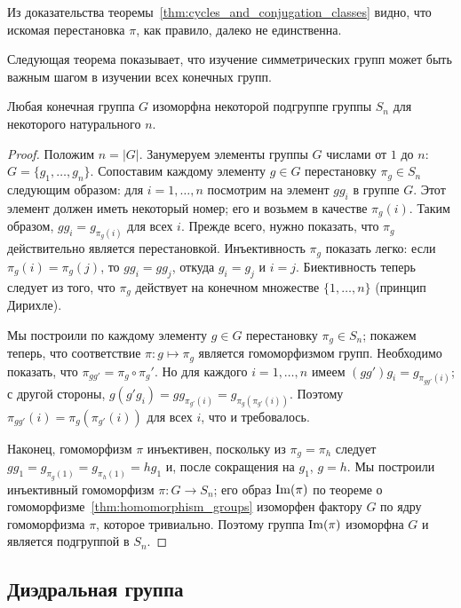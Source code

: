 \begin{remark}
Из доказательства теоремы~\ref{thm:cycles_and_conjugation_classes}
видно, что искомая перестановка $\pi$, как правило, далеко не
единственна.
\end{remark}

Следующая теорема показывает, что изучение симметрических групп может
быть важным шагом в изучении всех конечных групп.

\begin{theorem}
Любая конечная группа $G$ изоморфна некоторой подгруппе группы $S_n$
для некоторого натурального $n$.
\end{theorem}
\begin{proof}
Положим $n = |G|$. Занумеруем элементы группы $G$ числами от $1$ до
$n$: $G = \{g_1,\dots,g_n\}$.
Сопоставим каждому элементу $g\in G$ перестановку $\pi_g\in S_n$
следующим образом: для $i=1,\dots,n$ посмотрим на элемент $gg_i$
в группе $G$. Этот элемент должен иметь некоторый номер; его и возьмем
в качестве $\pi_g(i)$. Таким образом, $gg_i = g_{\pi_g(i)}$ для всех
$i$. Прежде всего, нужно показать, что $\pi_g$ действительно является
перестановкой. Инъективность $\pi_g$ показать легко: если $\pi_g(i) =
\pi_g(j)$, то $gg_i = gg_j$, откуда $g_i = g_j$ и $i=j$. Биективность
теперь следует из того, что $\pi_g$ действует на конечном множестве
$\{1,\dots,n\}$ (принцип Дирихле).

Мы построили по каждому элементу $g\in G$ перестановку $\pi_g\in S_n$;
покажем теперь, что соответствие $\pi\colon g\mapsto \pi_g$ является
гомоморфизмом групп. Необходимо показать,
что $\pi_{gg'} = \pi_g\circ\pi_g'$.
Но для каждого $i=1,\dots,n$ имеем
$(gg')g_i = g_{\pi_{gg'}(i)}$; с другой стороны,
$g(g'g_i) = gg_{\pi_{g'}(i)} = g_{\pi_g(\pi_{g'}(i))}$.
Поэтому $\pi_{gg'}(i) = \pi_g(\pi_{g'}(i))$ для всех $i$, что и
требовалось.

Наконец, гомоморфизм $\pi$ инъективен, поскольку
из $\pi_g = \pi_h$ следует $gg_1 = g_{\pi_g(1)} = g_{\pi_h(1)} = hg_1$
и, после сокращения на $g_1$, $g = h$.
Мы построили инъективный гомоморфизм $\pi\colon G\to S_n$; его образ
$\operatorname{Im}(\pi)$ по теореме о гомоморфизме~\ref{thm:homomorphism_groups}
изоморфен фактору $G$
по ядру гомоморфизма $\pi$, которое тривиально. Поэтому группа
$\operatorname{Im}(\pi)$ изоморфна $G$ и является подгруппой в $S_n$.
\end{proof}

\subsection{Диэдральная группа}

